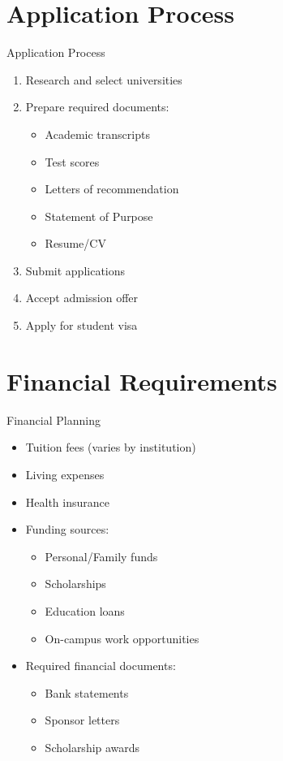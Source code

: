 \documentclass{beamer}
\begin{document}
\section{Application Process}
\begin{frame}{Application Process}
\begin{enumerate}
\item Research and select universities
\item Prepare required documents:
    \begin{itemize}
    \item Academic transcripts
    \item Test scores
    \item Letters of recommendation
    \item Statement of Purpose
    \item Resume/CV
    \end{itemize}
\item Submit applications
\item Accept admission offer
\item Apply for student visa
\end{enumerate}
\end{frame}

\section{Financial Requirements}
\begin{frame}{Financial Planning}
\begin{itemize}
\item Tuition fees (varies by institution)
\item Living expenses
\item Health insurance
\item Funding sources:
    \begin{itemize}
    \item Personal/Family funds
    \item Scholarships
    \item Education loans
    \item On-campus work opportunities
    \end{itemize}
\item Required financial documents:
    \begin{itemize}
    \item Bank statements
    \item Sponsor letters
    \item Scholarship awards
    \end{itemize}
\end{itemize}
\end{frame}
\end{document}
